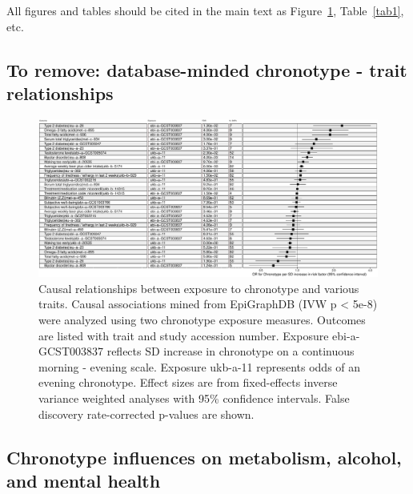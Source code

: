 \documentclass[journal,article,submit,moreauthors,pdftex]{Definitions/mdpi}
\begin{document}
All figures and tables should be cited in the main text as Figure~\ref{forestIVW}, Table~\ref{tab1}, etc.

\subsection{To remove: database-minded chronotype - trait relationships}



\begin{figure}[htbp]
	\centering
	\includegraphics[width=0.5\linewidth]{Figs/Analysis1/forestIVW.pdf}
	\caption{Causal relationships between exposure to chronotype and various traits. Causal associations mined from EpiGraphDB (IVW p < 5e-8) were analyzed using two chronotype exposure measures. Outcomes are listed with trait and study accession number. Exposure ebi-a-GCST003837 reflects SD increase in chronotype on a continuous morning - evening scale. Exposure ukb-a-11 represents odds of an evening chronotype. Effect sizes are from fixed-effects inverse variance weighted analyses with 95\% confidence intervals. False discovery rate-corrected p-values are shown.}
	\label{forestIVW}
\end{figure}

\subsection{Chronotype influences on metabolism, alcohol, and mental health}
\end{document}
